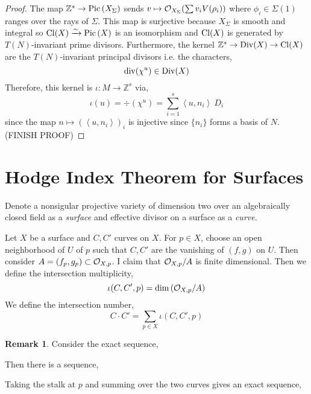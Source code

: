 \documentclass[12pt]{extarticle}
\newcommand{\Z}{\mathbb{Z}}
\theoremstyle{definition}
\newtheorem{remark}{Remark}
\newenvironment{definition}[1][Definition:]{\begin{trivlist}
\item[\hskip \labelsep {\bfseries #1}]}{\end{trivlist}}
\newcommand{\inner}[2]{\left< #1, #2 \right>}
\begin{document}
\begin{proof}
The map $\Z^s \to \Pic{X_\Sigma}$ sends $v \mapsto \mathcal{O}_{X_\Sigma}(\sum v_i V(\rho_i))$ where $\phi_i \in \Sigma(1)$ ranges over the rays of $\Sigma$. This map is surjective because $X_\Sigma$ is smooth and integral so $\mathrm{Cl}{(X)} \xrightarrow{\sim} \mathrm{Pic}\left( X \right)$ is an isomorphism and $\mathrm{Cl}{(X)}$ is generated by $T(N)$-invariant prime divisors. Furthermore, the kernel $\Z^s \to \Div{(X)} \to \Cl{(X)}$ are the $T(N)$-invariant principal divisors i.e. the characters,
\[ \mathrm{div}{(\chi^u)} \in \mathrm{Div}{(X)} \]
Therefore, this kernel is $\iota : M \to \Z^s$ via,
\[ \iota(u) = \div{(\chi^u)} = \sum_{i = 1}^s \inner{u}{n_i} \: D_i \]
since the map $n \mapsto (\inner{u}{n_i})_i$ is injective since $\{ n_i \}$ forms a basis of $N$. (FINISH PROOF)
\end{proof}

\section{Hodge Index Theorem for Surfaces}

\begin{definition}
Denote a nonsigular projective variety of dimension two over an algebraically closed field as a \textit{surface} and effective divisor on a surface as a \textit{curve}. 
\end{definition}

\begin{definition}
Let $X$ be a surface and $C, C'$ curves on $X$. For $p \in X$, choose an open neighborhood of $U$ of $p$ such that $C, C'$ are the vanishing of $(f, g)$ on $U$. Then consider $A = (f_p, g_p) \subset \mathcal{O}_{X, p}$. I claim that $\mathcal{O}_{X, p} / A$ is finite dimensional. Then we define the intersection multiplicity,
\[ \iota(C, C', p) = \dim \left( \mathcal{O}_{X, p} / A \right) \]
We define the intersection number,
\[ C \cdot C' = \sum_{p \in X} \iota(C, C', p) \]
\end{definition}

\begin{remark}
Consider the exact sequence,
\begin{center}
\end{center}
Then there is a sequence,
\begin{center}
\end{center}
Taking the stalk at $p$ and summing over the two curves gives an exact sequence,
\begin{center}
\end{center}
\end{remark}
\end{document}
